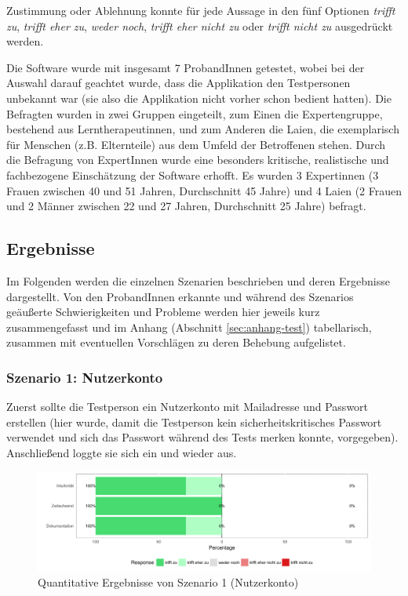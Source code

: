Zustimmung oder Ablehnung konnte für jede Aussage in den fünf Optionen \textit{trifft zu}, \textit{trifft eher zu}, \textit{weder noch}, \textit{trifft eher nicht zu} oder \textit{trifft nicht zu} ausgedrückt werden.

Die Software wurde mit insgesamt 7 ProbandInnen getestet, wobei bei der Auswahl darauf geachtet wurde, dass die  Applikation den Testpersonen unbekannt war (sie also die Applikation nicht vorher schon bedient hatten). Die Befragten wurden in zwei Gruppen eingeteilt, zum Einen die Expertengruppe, bestehend aus Lerntherapeutinnen, und zum Anderen die Laien, die exemplarisch für Menschen (z.B. Elternteile) aus dem Umfeld der Betroffenen stehen. Durch die Befragung von ExpertInnen wurde eine besonders kritische, realistische und fachbezogene Einschätzung der Software erhofft. Es wurden 3 Expertinnen (3 Frauen zwischen 40 und 51 Jahren, Durchschnitt 45 Jahre) und 4 Laien (2 Frauen und 2 Männer zwischen 22 und 27 Jahren, Durchschnitt 25 Jahre) befragt.\\

\subsection{Ergebnisse}

Im Folgenden werden die einzelnen Szenarien beschrieben und deren Ergebnisse dargestellt. Von den ProbandInnen erkannte und während des Szenarios geäußerte Schwierigkeiten und Probleme werden hier jeweils kurz zusammengefasst und im Anhang (Abschnitt \ref{sec:anhang-test}) tabellarisch, zusammen mit eventuellen Vorschlägen zu deren Behebung aufgelistet.

\subsubsection{Szenario 1: Nutzerkonto}

Zuerst sollte die Testperson ein Nutzerkonto mit Mailadresse und Passwort erstellen (hier wurde, damit die Testperson kein sicherheitskritisches Passwort verwendet und sich das Passwort während des Tests merken konnte,  vorgegeben). Anschließend loggte sie sich ein und wieder aus.

\begin{figure}[h!]
	\centering
	\includegraphics[width=.8\linewidth]{figures/evaluation/scenario1}
	\caption{Quantitative Ergebnisse von Szenario 1 (Nutzerkonto)}
	\label{fig:evaluation-sc1}
\end{figure}

